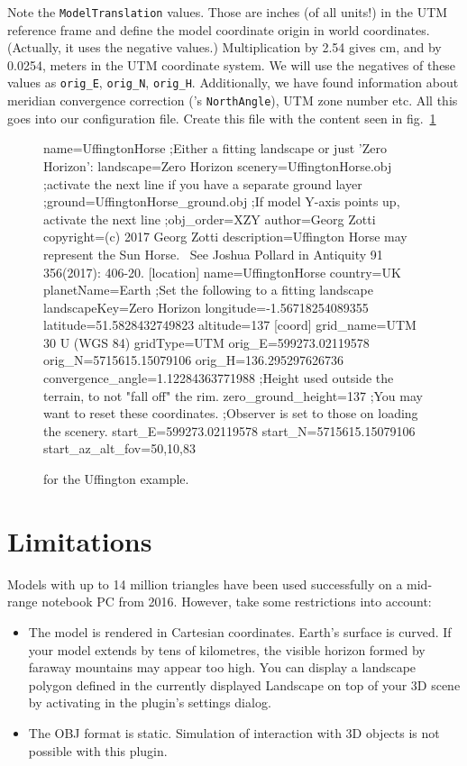 Note the \texttt{ModelTranslation} values. Those are inches (of all units!) in the UTM reference frame 
and define the model coordinate origin in world coordinates. (Actually, it uses the negative values.) 
Multiplication by 2.54 gives cm, and by 0.0254, meters in the UTM coordinate system. 
We will use the negatives of these values as \texttt{orig\_E}, \texttt{orig\_N}, \texttt{orig\_H}. 
Additionally, we have found information about meridian convergence correction ('s \texttt{NorthAngle}), 
UTM zone number etc. All this goes into our configuration file. 
Create this file  with the content seen in fig.~\ref{fig:scenery3d:UffingtonIni}
\begin{figure}[p]
\begin{configfile}
[model]
name=UffingtonHorse
;Either a fitting landscape or just 'Zero Horizon':
landscape=Zero Horizon
scenery=UffingtonHorse.obj
;activate the next line if you have a separate ground layer 
;ground=UffingtonHorse_ground.obj
;If model Y-axis points up, activate the next line
;obj_order=XZY
author=Georg Zotti
copyright=(c) 2017 Georg Zotti
description=Uffington Horse may represent the Sun Horse. \
        See Joshua Pollard in Antiquity 91 356(2017): 406-20.
[location]
name=UffingtonHorse
country=UK
planetName=Earth
;Set the following to a fitting landscape
landscapeKey=Zero Horizon
longitude=-1.56718254089355
latitude=51.5828432749823
altitude=137
[coord]
grid_name=UTM 30 U (WGS 84)
gridType=UTM
orig_E=599273.02119578
orig_N=5715615.15079106
orig_H=136.295297626736
convergence_angle=1.12284363771988
;Height used outside the terrain, to not "fall off" the rim.
zero_ground_height=137
;You may want to reset these coordinates. 
;Observer is set to those on loading the scenery.
start_E=599273.02119578
start_N=5715615.15079106
start_az_alt_fov=50,10,83
\end{configfile}
\caption{ for the Uffington example.}
\label{fig:scenery3d:UffingtonIni}
\end{figure}

\section{Limitations}
\label{sec:scenery3d:Limitations}

Models with up to 14 million triangles have been used successfully on
a mid-range notebook PC from 2016. However, take some restrictions
into account:

\begin{itemize}
\item The model is rendered in Cartesian coordinates. Earth's surface
  is curved. If your model extends by tens of kilometres, the visible
  horizon formed by faraway mountains may appear too high. You can
  \newFeature{v0.20.2} display a landscape polygon defined in the
  currently displayed Landscape on top of your 3D scene by activating
  \menu{Draw horizon polyline in foreground} in the plugin's
  settings dialog.
\item
  The OBJ format is static. Simulation of interaction with 3D objects
  is not possible with this plugin.
\end{itemize}

